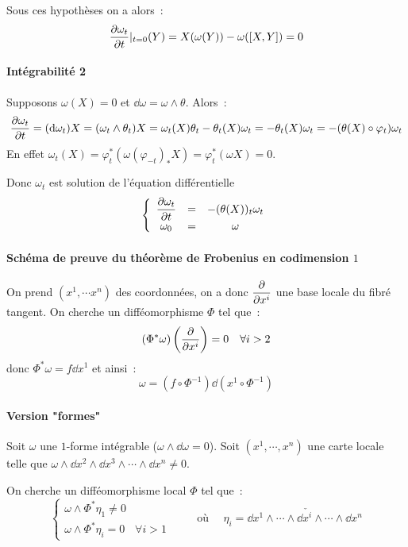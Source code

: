 \documentclass[a4paper]{article}
\begin{document}
Sous ces hypothèses on a alors~:
\[
\dfrac{\partial{\omega_t}}{\partial{t}}|_{t=0} (Y) = X(\omega(Y)) - \omega([X,Y]) = 0
\]

\paragraph{Intégrabilité 2} Supposons $\omega(X) = 0$ et $\dd \omega = \omega \wedge \theta$. Alors~:
\[
\dfrac{\partial{\omega_t}}{\partial{t}} = (\operatorname{d\!} \omega_t) X = (\omega_t \wedge \theta_t) X = \omega_t(X) \theta_t - \theta_t(X) \omega_t
= - \theta_t(X) \omega_t = -(\theta(X) \circ \varphi_t) \omega_t
\]
En effet $\omega_t(X) = \varphi_t^*(\omega(\varphi_{-t})_* X) = \varphi_t^* (\omega X) = 0$.

Donc $\omega_t$ est solution de l'équation différentielle
\[
\left\lbrace
\begin{array}{ccc}
 \dfrac{\partial{\omega_t}}{\partial{t}} &=&- (\theta(X))_t \omega_t  \\ 
 \omega_0 &=& \omega
\end{array} 
\right.
\]

\paragraph{Schéma de preuve du théorème de Frobenius en codimension $1$} On prend $(x^1, \cdots x^n)$ des coordonnées, on a donc $\dfrac{\partial{}}{\partial{x^i}}$ une base locale du fibré tangent. On cherche un difféomorphisme $\Phi$ tel que~:
\[
(\Phi^*\omega)\left(\dfrac{\partial{}}{\partial{x^i}}\right) = 0 \quad \forall i > 2
\]
donc $\Phi^*\omega = f \dd x^1$ et ainsi~:
\[
\omega = (f \circ \Phi^{-1}) \dd \left( x^1 \circ \Phi^{-1}\right)
\]

\paragraph{Version "formes"}
Soit $\omega$ une $1$-forme intégrable ($\omega \wedge \dd \omega = 0$). Soit $(x^1,\cdots, x^n)$ une carte locale telle que $\omega \wedge \dd x^2 \wedge \dd x^3 \wedge \cdots \wedge \dd x^n \neq 0$.

On cherche un difféomorphisme local $\Phi$ tel que~:
\[
\left\lbrace
\begin{array}{cc}
 \omega \wedge \Phi^*\eta_1 \neq 0 &  \\ 
 \omega \wedge \Phi^*\eta_i = 0  & \forall i > 1
\end{array} 
\right. \qquad \text{ où } \quad \eta_i = \dd x^1 \wedge \cdots \wedge \dd \check{x^i} \wedge \cdots \wedge \dd x^n
\]
\end{document}
